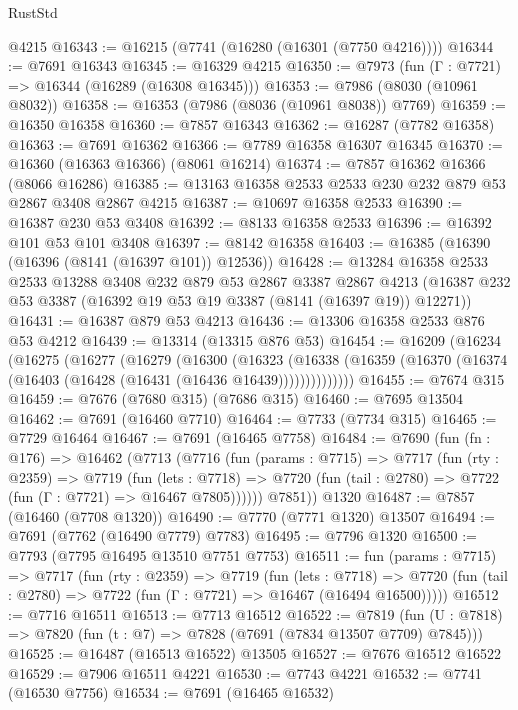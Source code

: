 \begin{lexlean}{RustStd}
\begin{coremodule}
    @4215
@16343 := @16215 (@7741 (@16280 (@16301 (@7750 @4216))))
@16344 := @7691 @16343
@16345 := @16329 @4215
@16350 := @7973 (fun (Γ : @7721) => @16344 (@16289 (@16308 @16345)))
@16353 := @7986 (@8030 (@10961 @8032))
@16358 := @16353 (@7986 (@8036 (@10961 @8038)) @7769)
@16359 := @16350 @16358
@16360 := @7857 @16343
@16362 := @16287 (@7782 @16358)
@16363 := @7691 @16362
@16366 := @7789 @16358 @16307 @16345
@16370 := @16360 (@16363 @16366) (@8061 @16214)
@16374 := @7857 @16362 @16366 (@8066 @16286)
@16385 := @13163 @16358 @2533 @2533 @230 @232 @879 @53 @2867 @3408 @2867 @4215
@16387 := @10697 @16358 @2533
@16390 := @16387 @230 @53 @3408
@16392 := @8133 @16358 @2533
@16396 := @16392 @101 @53 @101 @3408
@16397 := @8142 @16358
@16403 := @16385 (@16390 (@16396 (@8141 (@16397 @101)) @12536))
@16428 := @13284
    @16358
    @2533
    @2533
    @13288
    @3408
    @232
    @879
    @53
    @2867
    @3387
    @2867
    @4213
    (@16387 @232 @53 @3387 (@16392 @19 @53 @19 @3387 (@8141 (@16397 @19)) @12271))
@16431 := @16387 @879 @53 @4213
@16436 := @13306 @16358 @2533 @876 @53 @4212
@16439 := @13314 (@13315 @876 @53)
@16454 := @16209
    (@16234
      (@16275
        (@16277
          (@16279
            (@16300
              (@16323
                (@16338 (@16359 (@16370 (@16374 (@16403 (@16428 (@16431 (@16436 @16439))))))))))))))
@16455 := @7674 @315
@16459 := @7676 (@7680 @315) (@7686 @315)
@16460 := @7695 @13504
@16462 := @7691 (@16460 @7710)
@16464 := @7733 (@7734 @315)
@16465 := @7729 @16464
@16467 := @7691 (@16465 @7758)
@16484 := @7690
    (fun (fn : @176) =>
    @16462
      (@7713
        (@7716
          (fun (params : @7715) =>
          @7717
            (fun (rty : @2359) =>
            @7719
              (fun (lets : @7718) =>
              @7720 (fun (tail : @2780) => @7722 (fun (Γ : @7721) => @16467 @7805))))))
        @7851))
    @1320
@16487 := @7857 (@16460 (@7708 @1320))
@16490 := @7770 (@7771 @1320) @13507
@16494 := @7691 (@7762 (@16490 @7779) @7783)
@16495 := @7796 @1320
@16500 := @7793 (@7795 @16495 @13510 @7751 @7753)
@16511 := fun (params : @7715) =>
  @7717
    (fun (rty : @2359) =>
    @7719
      (fun (lets : @7718) =>
      @7720 (fun (tail : @2780) => @7722 (fun (Γ : @7721) => @16467 (@16494 @16500)))))
@16512 := @7716 @16511
@16513 := @7713 @16512
@16522 := @7819
    (fun (U : @7818) => @7820 (fun (t : @7) => @7828 (@7691 (@7834 @13507 @7709) @7845)))
@16525 := @16487 (@16513 @16522) @13505
@16527 := @7676 @16512 @16522
@16529 := @7906 @16511 @4221
@16530 := @7743 @4221
@16532 := @7741 (@16530 @7756)
@16534 := @7691 (@16465 @16532)

\end{coremodule}
\end{lexlean}
